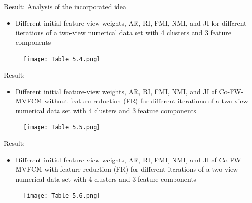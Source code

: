 \documentclass[compress,sky blue]{beamer}
\begin{document}
\begin{frame}{Result: Analysis of the incorporated idea }
\begin{itemize}
\item \scriptsize{Different initial feature-view weights, AR, RI, FMI, NMI, and JI for different iterations of a two-view numerical data set with 4 clusters and 3 feature components}
\end{itemize}

\begin{figure}
\texttt{[image: Table 5.4.png]}
\end{figure}
\end{frame}

\begin{frame}{Result:  }

\begin{itemize}
\item \scriptsize{Different initial feature-view weights, AR, RI, FMI, NMI, and JI of Co-FW-MVFCM without feature reduction (FR) for different iterations of a two-view numerical data set with 4 clusters and 3 feature components
}
\end{itemize}

\begin{figure}
\texttt{[image: Table 5.5.png]}
\end{figure}
\end{frame}

\begin{frame}{Result:  }

\begin{itemize}
\item \scriptsize{Different initial feature-view weights, AR, RI, FMI, NMI, and JI of Co-FW-MVFCM with feature reduction (FR) for different iterations of a two-view numerical data set with 4 clusters and 3 feature components}
\end{itemize}

\begin{figure}
\texttt{[image: Table 5.6.png]}
\end{figure}
\end{frame}
\end{document}
